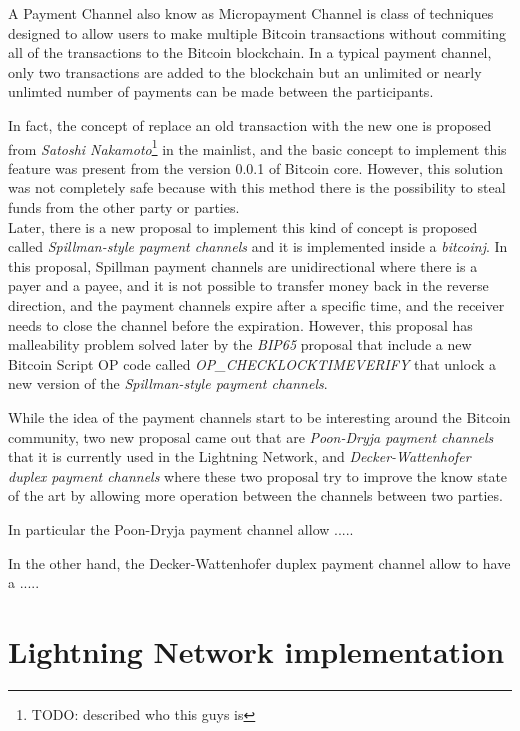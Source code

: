A Payment Channel also know as Micropayment Channel is class of techniques designed to allow users to make multiple
Bitcoin transactions without commiting all of the transactions to the Bitcoin blockchain. In a typical payment channel,
only two transactions are added to the blockchain but an unlimited or nearly unlimted number of payments
can be made between the participants.

In fact, the concept of replace an old transaction with the new one is proposed from \emph{Satoshi Nakamoto}\footnote{TODO: described who this guys is} in the mainlist\cite{payment-channels-satoshi}, and
the basic concept to implement this feature was present from the version 0.0.1 of Bitcoin core. However, this solution
was not completely safe because with this method there is the possibility to steal funds from the other party or parties.\\

Later, there is a new proposal to implement this kind of concept is proposed called \emph{Spillman-style payment channels} and it is
implemented inside a \emph{bitcoinj}\cite{bitcoinj-impl}. In this proposal, Spillman payment channels are unidirectional where
there is a payer and a payee, and it is not possible to transfer money back in the reverse direction, and the payment
channels expire after a specific time, and the receiver needs to close the channel before the expiration. However, this
proposal has malleability problem solved later by the \emph{BIP65}\cite{bip65} proposal that include a new Bitcoin Script OP code
called \emph{OP\_CHECKLOCKTIMEVERIFY} that unlock a new version of the \emph{Spillman-style payment channels}.

While the idea of the payment channels start to be interesting around the Bitcoin community, two new proposal came out that are
\emph{Poon-Dryja payment channels}\cite{lightning-network-paper} that it is currently used in the Lightning Network,
and \emph{Decker-Wattenhofer duplex payment channels}\cite{Decker2015fast} where these two proposal try to improve the know state
of the art by allowing more operation between the channels between two parties.

In particular the Poon-Dryja payment channel allow .....


In the other hand, the Decker-Wattenhofer duplex payment channel allow to have a .....

\section{Lightning Network implementation}

